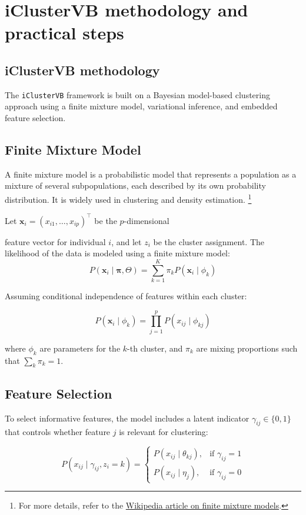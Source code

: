 \section{iClusterVB methodology and practical steps}

\subsection{iClusterVB methodology}

The \texttt{iClusterVB} framework is built on a Bayesian model-based clustering approach using a finite mixture model, variational inference, and embedded feature selection.

\subsection{Finite Mixture Model}

A finite mixture model is a probabilistic model that represents a population as a mixture of 
several subpopulations, each described by its own probability distribution. 
It is widely used in clustering and density estimation. 
\footnote{For more details, refer 
to the \href{https://en.wikipedia.org/wiki/Mixture_model}{Wikipedia article on finite mixture models}.}

Let $\mathbf{x}_i = (x_{i1}, \ldots, x_{ip})^\top$ be the $p$-dimensional 

feature vector for individual $i$, and let $z_i$ be the cluster assignment. 
The likelihood of the data is modeled using a finite mixture model:
\[
P(\mathbf{x}_i \mid \boldsymbol{\pi}, \Theta) = \sum_{k=1}^{K} \pi_k P(\mathbf{x}_i \mid \phi_k)
\]

Assuming conditional independence of features within each cluster:

\[
P(\mathbf{x}_i \mid \phi_k) = \prod_{j=1}^{p} P(x_{ij} \mid \phi_{kj})
\]

where $\phi_k$ are parameters for the $k$-th cluster, and $\pi_k$ are mixing proportions such that $\sum_k \pi_k = 1$.

\subsection{Feature Selection}

To select informative features, the model includes a latent indicator $\gamma_{ij} \in \{0,1\}$ that controls whether feature $j$ is relevant for clustering:

\[
P(x_{ij} \mid \gamma_{ij}, z_i = k) = 
\begin{cases}
P(x_{ij} \mid \theta_{kj}), & \text{if } \gamma_{ij} = 1 \\
P(x_{ij} \mid \eta_j), & \text{if } \gamma_{ij} = 0
\end{cases}
\]

